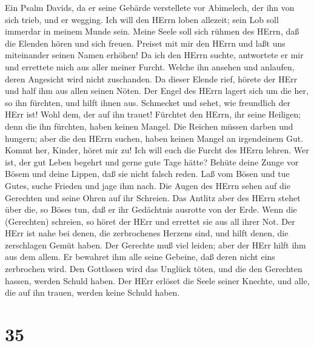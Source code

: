  Ein Psalm Davids, da er seine Gebärde verstellete vor
Abimelech, der ihn von sich trieb, und er wegging.  Ich will
den HErrn loben allezeit; sein Lob soll immerdar in meinem Munde sein.
 Meine Seele soll sich rühmen des HErrn, daß die Elenden
hören und sich freuen.  Preiset mit mir den HErrn und laßt
uns miteinander seinen Namen erhöhen!  Da ich den HErrn
suchte, antwortete er mir und errettete mich aus aller meiner Furcht.
 Welche ihn ansehen und anlaufen, deren Angesicht wird nicht
zuschanden.  Da dieser Elende rief, hörete der HErr und half
ihm aus allen seinen Nöten.  Der Engel des HErrn lagert sich
um die her, so ihn fürchten, und hilft ihnen aus.  Schmecket
und sehet, wie freundlich der HErr ist! Wohl dem, der auf ihn trauet!
 Fürchtet den HErrn, ihr seine Heiligen; denn die ihn
fürchten, haben keinen Mangel.  Die Reichen müssen darben
und hungern; aber die den HErrn suchen, haben keinen Mangel an
irgendeinem Gut.  Kommt her, Kinder, höret mir zu! Ich will
euch die Furcht des HErrn lehren.  Wer ist, der gut Leben
begehrt und gerne gute Tage hätte?  Behüte deine Zunge vor
Bösem und deine Lippen, daß sie nicht falsch reden.  Laß
vom Bösen und tue Gutes, suche Frieden und jage ihm nach. 
Die Augen des HErrn sehen auf die Gerechten und seine Ohren auf ihr
Schreien.  Das Antlitz aber des HErrn stehet über die, so
Böses tun, daß er ihr Gedächtnis ausrotte von der Erde. 
Wenn die (Gerechten) schreien, so höret der HErr und errettet sie aus
all ihrer Not.  Der HErr ist nahe bei denen, die
zerbrochenes Herzens sind, und hilft denen, die zerschlagen Gemüt haben.
 Der Gerechte muß viel leiden; aber der HErr hilft ihm aus
dem allem.  Er bewahret ihm alle seine Gebeine, daß deren
nicht eins zerbrochen wird.  Den Gottlosen wird das Unglück
töten, und die den Gerechten hassen, werden Schuld haben. 
Der HErr erlöset die Seele seiner Knechte, und alle, die auf ihn trauen,
werden keine Schuld haben.

\hypertarget{section-34}{%
\section{35}\label{section-34}}

